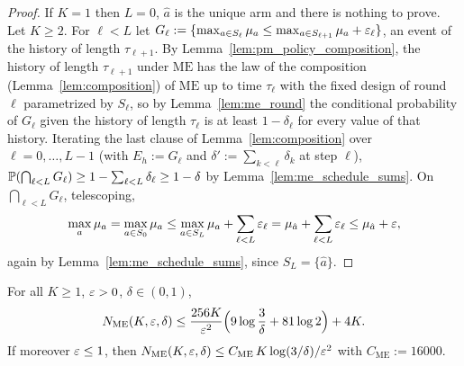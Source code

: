 \begin{proof}
\leanok
{}
If $K = 1$ then $L = 0$, $\hat a$ is the unique arm and there is nothing to prove. Let $K\ge2$.
For $\ell<L$ let $G_\ell := \{\max_{a\in S_\ell}\mu_a\le\max_{a\in S_{\ell+1}}\mu_a+\varepsilon_\ell\}$,
an event of the history of length $\tau_{\ell+1}$. By Lemma~\ref{lem:pm_policy_composition},
the history of length $\tau_{\ell+1}$ under $\mathrm{ME}$ has the law of the composition
(Lemma~\ref{lem:composition}) of $\mathrm{ME}$ up to time $\tau_\ell$ with the fixed design
of round $\ell$ parametrized by $S_\ell$, so by Lemma~\ref{lem:me_round} the conditional
probability of $G_\ell$ given the history of length $\tau_\ell$ is at least $1-\delta_\ell$
for every value of that history.
Iterating the last clause of Lemma~\ref{lem:composition} over $\ell = 0,\dots,L-1$ (with
$E_h := G_\ell$ and $\delta' := \sum_{k<\ell}\delta_k$ at step $\ell$),
$\mathbb{P}(\bigcap_{\ell<L}G_\ell)\ge1-\sum_{\ell<L}\delta_\ell\ge1-\delta$ by
Lemma~\ref{lem:me_schedule_sums}. On $\bigcap_{\ell<L}G_\ell$, telescoping,
\[
  \max_{a}\mu_a = \max_{a\in S_0}\mu_a\le\max_{a\in S_L}\mu_a+\sum_{\ell<L}\varepsilon_\ell
  = \mu_{\hat a}+\sum_{\ell<L}\varepsilon_\ell\le\mu_{\hat a}+\varepsilon ,
\]
again by Lemma~\ref{lem:me_schedule_sums}, since $S_L = \{\hat a\}$.
\end{proof}

\begin{lemma}\label{lem:me_budget}
\leanok
{}
For all $K\ge1$, $\varepsilon>0$, $\delta\in(0,1)$,
\[
  N_{\mathrm{ME}}(K,\varepsilon,\delta)\le\frac{256K}{\varepsilon^2}\Big(9\log\frac3\delta+81\log2\Big)+4K .
\]
If moreover $\varepsilon\le1$, then $N_{\mathrm{ME}}(K,\varepsilon,\delta)\le C_{\mathrm{ME}}\,K\log(3/\delta)/\varepsilon^2$
with $C_{\mathrm{ME}} := 16000$.
\end{lemma}


